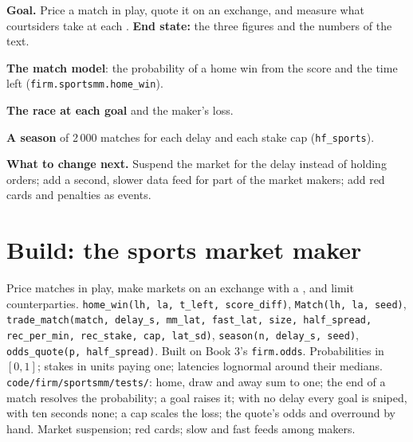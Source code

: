 \begin{tutorial}
\textbf{Goal.} Price a match in play, quote it on an exchange, and measure what courtsiders take at each . \textbf{End state:} the three
figures and the numbers of the text.
\begin{tutsteps}
\item \textbf{The match model}: the probability of a home win from the score and the time left (\texttt{firm.sportsmm.home\_win}).
\item \textbf{The race at each goal} and the maker's loss.
\label{lst:hf:prediction-and-sports-market-making:trade}
\item \textbf{A season} of 2\,000 matches for each delay and each stake cap (\texttt{hf\_sports}).
\end{tutsteps}
\textbf{What to change next.} Suspend the market for the delay instead of holding orders; add a second, slower data feed for part of the
market makers; add red cards and penalties as events.
\end{tutorial}

\section{Build: the sports market maker}\label{bld:hf:prediction-and-sports-market-making:sportsmm}

\begin{build}
 Price matches in play, make markets on an exchange with a , and limit counterparties.
 \texttt{home\_win(lh, la, t\_left, score\_diff)}, \texttt{Match(lh, la, seed)}, \texttt{trade\_match(match, delay\_s, mm\_lat,
fast\_lat, size, half\_spread, rec\_per\_min, rec\_stake, cap, lat\_sd)}, \texttt{season(n, delay\_s, seed)}, \texttt{odds\_quote(p, half\_spread)}.
Built on Book 3's \texttt{firm.odds}.
 Probabilities in $[0,1]$; stakes in units paying one; latencies lognormal around their medians.
 \texttt{code/firm/sportsmm/tests/}: home, draw and away sum to one; the end of a match resolves the probability; a goal
raises it; with no delay every goal is sniped, with ten seconds none; a cap scales the loss; the quote's odds and overround by hand.
 Market suspension; red cards; slow and fast feeds among makers.
\end{build}

